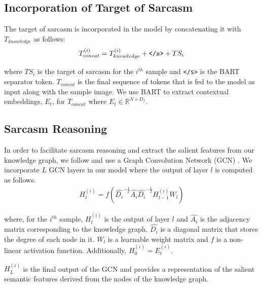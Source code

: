 \subsection{Incorporation of Target of Sarcasm}
\label{sec:incorporation-of-target}
The target of sarcasm is incorporated in the model by concatenating it with $T_{knowledge}$ as follows:
\begin{equation}
\label{eq:target-incorporation}
T_{concat}^{(i)} = T_{knowledge}^{(i)} + \verb|</s>| + TS_i
\end{equation}

\noindent where $TS_i$ is the target of sarcasm for the $i^{th}$ sample and \verb|</s>| is the BART separator token. $T_{concat}$ is the final sequence of tokens that is fed to the model as input along with the sample image. We use BART to extract contextual embeddings, $E_t$, for $T_{concat}$ where $E_t \in \mathbb{R}^{N \times D_f}$.

\subsection{Sarcasm Reasoning}
\label{sec:graph-convolution}
In order to facilitate sarcasm reasoning and extract the salient features from our knowledge graph, we follow  and use a Graph Convolution Network (GCN) \cite{kipf2017semisupervised}. We incorporate $L$ GCN layers in our model where the output of layer $l$ is computed as follows. 
\begin{equation}
  \label{eq:gcn}
  \begin{aligned}
    H_l^{(i)} = f(\hat{D_i}^{-\frac{1}{2}}\hat{A_i}\hat{D_i}^{-\frac{1}{2}}H_{l-1}^{(i)}W_l)
  \end{aligned}
\end{equation}

\noindent where, for the $i^{th}$ sample, $H_l^{(i)}$ is the output of layer $l$ and $\hat{A_i}$ is the adjacency matrix corresponding to the knowledge graph. $\hat{D_i}$ is a diagonal matrix that stores the degree of each node in it. $W_l$ is a learnable weight matrix and $f$ is a non-linear activation function. Additionally, $H_0^{(i)} = E_t^{(i)}$.

$H_L^{(i)}$ is the final output of the GCN and provides a representation of the salient semantic features derived from the nodes of the knowledge graph. 

